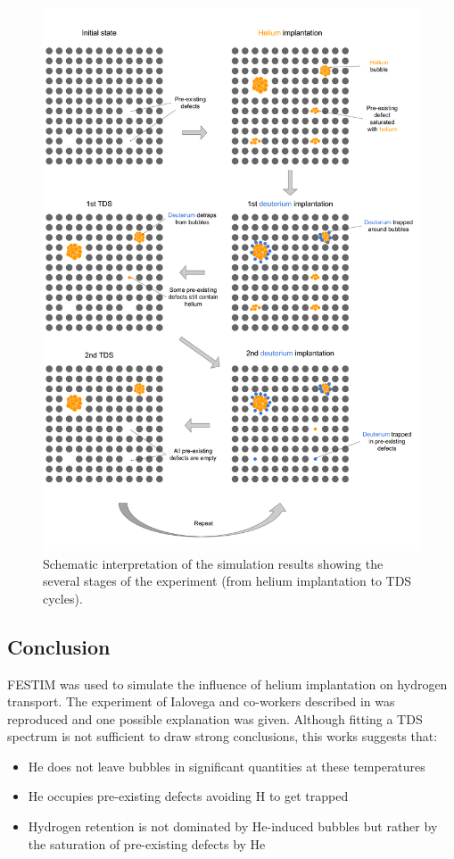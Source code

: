 \begin{figure}
    \centering
    \includegraphics[width=\linewidth]{Figures/Chapter5/sketch ialovega experiment.pdf}
    \caption{Schematic interpretation of the simulation results showing the several stages of the experiment (from helium implantation to TDS cycles).}
\end{figure}

\subsection{Conclusion}

FESTIM was used to simulate the influence of helium implantation on hydrogen transport.
The experiment of Ialovega and co-workers described in  was reproduced and one possible explanation was given.
Although fitting a TDS spectrum is not sufficient to draw strong conclusions, this works suggests that:
\begin{itemize}
    \item He does not leave bubbles in significant quantities at these temperatures
    \item He occupies pre-existing defects avoiding H to get trapped
    \item Hydrogen retention is not dominated by He-induced bubbles but rather by the saturation of pre-existing defects by He
\end{itemize}

